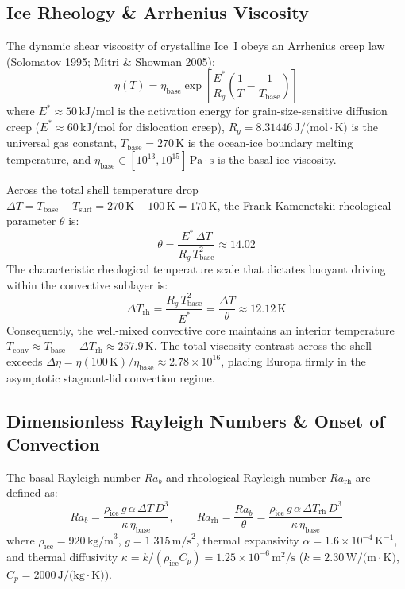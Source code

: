 \documentclass[11pt,a4paper]{article}
\begin{document}
\subsection{Ice Rheology \& Arrhenius Viscosity}
The dynamic shear viscosity of crystalline Ice~I obeys an Arrhenius creep law (Solomatov 1995; Mitri \& Showman 2005):
\begin{equation}
\eta(T) = \eta_{\text{base}} \exp\left[ \frac{E^*}{R_g} \left( \frac{1}{T} - \frac{1}{T_{\text{base}}} \right) \right]
\label{eq:viscosity}
\end{equation}
where $E^* \approx 50\,\text{kJ/mol}$ is the activation energy for grain-size-sensitive diffusion creep ($E^* \approx 60\,\text{kJ/mol}$ for dislocation creep), $R_g = 8.31446\,\text{J/(mol}\cdot\text{K)}$ is the universal gas constant, $T_{\text{base}} = 270\,\text{K}$ is the ocean-ice boundary melting temperature, and $\eta_{\text{base}} \in [10^{13}, 10^{15}]\,\text{Pa}\cdot\text{s}$ is the basal ice viscosity.

Across the total shell temperature drop $\Delta T = T_{\text{base}} - T_{\text{surf}} = 270\,\text{K} - 100\,\text{K} = 170\,\text{K}$, the Frank-Kamenetskii rheological parameter $\theta$ is:
\begin{equation}
\theta = \frac{E^* \, \Delta T}{R_g \, T_{\text{base}}^2} \approx 14.02
\label{eq:theta}
\end{equation}
The characteristic rheological temperature scale that dictates buoyant driving within the convective sublayer is:
\begin{equation}
\Delta T_{\text{rh}} = \frac{R_g \, T_{\text{base}}^2}{E^*} = \frac{\Delta T}{\theta} \approx 12.12\,\text{K}
\label{eq:delta_trh}
\end{equation}
Consequently, the well-mixed convective core maintains an interior temperature $T_{\text{conv}} \approx T_{\text{base}} - \Delta T_{\text{rh}} \approx 257.9\,\text{K}$. The total viscosity contrast across the shell exceeds $\Delta\eta = \eta(100\,\text{K}) / \eta_{\text{base}} \approx 2.78 \times 10^{16}$, placing Europa firmly in the asymptotic stagnant-lid convection regime.

\subsection{Dimensionless Rayleigh Numbers \& Onset of Convection}
The basal Rayleigh number $Ra_b$ and rheological Rayleigh number $Ra_{\text{rh}}$ are defined as:
\begin{equation}
Ra_b = \frac{\rho_{\text{ice}} \, g \, \alpha \, \Delta T \, D^3}{\kappa \, \eta_{\text{base}}}, \qquad Ra_{\text{rh}} = \frac{Ra_b}{\theta} = \frac{\rho_{\text{ice}} \, g \, \alpha \, \Delta T_{\text{rh}} \, D^3}{\kappa \, \eta_{\text{base}}}
\label{eq:rayleigh}
\end{equation}
where $\rho_{\text{ice}} = 920\,\text{kg/m}^3$, $g = 1.315\,\text{m/s}^2$, thermal expansivity $\alpha = 1.6 \times 10^{-4}\,\text{K}^{-1}$, and thermal diffusivity $\kappa = k / (\rho_{\text{ice}} C_p) = 1.25 \times 10^{-6}\,\text{m}^2/\text{s}$ ($k = 2.30\,\text{W/(m}\cdot\text{K)}$, $C_p = 2000\,\text{J/(kg}\cdot\text{K)}$).
\end{document}
